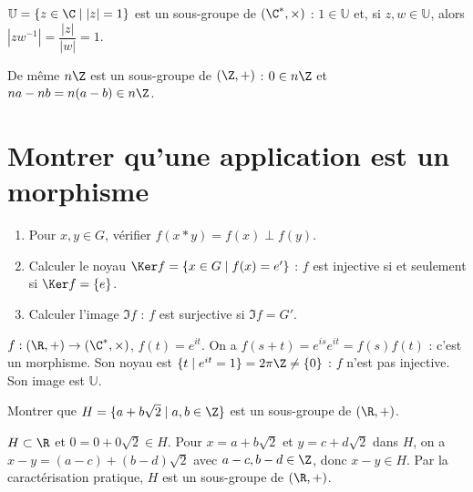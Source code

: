 \begin{exemple}
$\mathbb U=\{z\in\C\mid |z|=1\}$ est un sous-groupe de $(\C^*,\times)$ : $1\in\mathbb U$ et, si $z,w\in\mathbb U$, alors $|zw^{-1}|=\dfrac{|z|}{|w|}=1$.

De même $n\Z$ est un sous-groupe de $(\Z,+)$ : $0\in n\Z$ et $na-nb=n(a-b)\in n\Z$.
\end{exemple}

\section{Montrer qu'une application est un morphisme}

\begin{methode}
\begin{enumerate}[label=\textbf{Étape \arabic*.}]
  \item Pour $x,y\in G$, vérifier $f(x*y)=f(x)\perp f(y)$.
  \item Calculer le noyau $\Ker f=\{x\in G\mid f(x)=e'\}$ : $f$ est injective si et seulement si $\Ker f=\{e\}$.
  \item Calculer l'image $\Im f$ : $f$ est surjective si $\Im f=G'$.
\end{enumerate}
\end{methode}

\begin{exemple}
$f:(\R,+)\to(\C^*,\times)$, $f(t)=e^{it}$. On a $f(s+t)=e^{is}e^{it}=f(s)f(t)$ : c'est un morphisme. Son noyau est $\{t\mid e^{it}=1\}=2\pi\Z\ne\{0\}$ : $f$ n'est pas injective. Son image est $\mathbb U$.
\end{exemple}

\begin{exercice}[Application]
Montrer que $H=\{a+b\sqrt2\mid a,b\in\Z\}$ est un sous-groupe de $(\R,+)$.
\begin{correction}
$H\subset\R$ et $0=0+0\sqrt2\in H$. Pour $x=a+b\sqrt2$ et $y=c+d\sqrt2$ dans $H$, on a $x-y=(a-c)+(b-d)\sqrt2$ avec $a-c,b-d\in\Z$, donc $x-y\in H$. Par la caractérisation pratique, $H$ est un sous-groupe de $(\R,+)$.
\end{correction}
\end{exercice}

